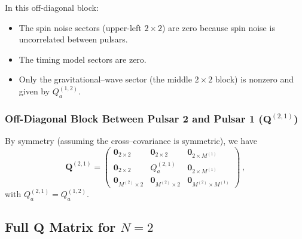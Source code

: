 \documentclass{tufte-handout} %
\begin{document}
	In this off-diagonal block:
	\begin{itemize}
		\item The spin noise sectors (upper-left \(2\times2\)) are zero because spin noise is uncorrelated between pulsars.
		\item The timing model sectors are zero.
		\item Only the gravitational–wave sector (the middle \(2\times2\) block) is nonzero and given by \(Q_a^{(1,2)}\).
	\end{itemize}
	
	\subsubsection*{Off-Diagonal Block Between Pulsar 2 and Pulsar 1 (\(\boldsymbol{Q}^{(2,1)}\))}
	
	By symmetry (assuming the cross–covariance is symmetric), we have
	\begin{equation}
		\boldsymbol{Q}^{(2,1)} =
		\begin{pmatrix}
			\boldsymbol{0}_{2\times2} & \boldsymbol{0}_{2\times2} & \boldsymbol{0}_{2\times M^{(1)}} \\[2mm]
			\boldsymbol{0}_{2\times2} & Q_a^{(2,1)} & \boldsymbol{0}_{2\times M^{(1)}} \\[2mm]
			\boldsymbol{0}_{M^{(2)}\times2} & \boldsymbol{0}_{M^{(2)}\times2} & \boldsymbol{0}_{M^{(2)}\times M^{(1)}}
		\end{pmatrix}\,,
	\end{equation}
	with \(Q_a^{(2,1)} = Q_a^{(1,2)}\).
	
	\subsection*{Full \(\boldsymbol{Q}\) Matrix for \(N=2\)}
	
\end{document}
